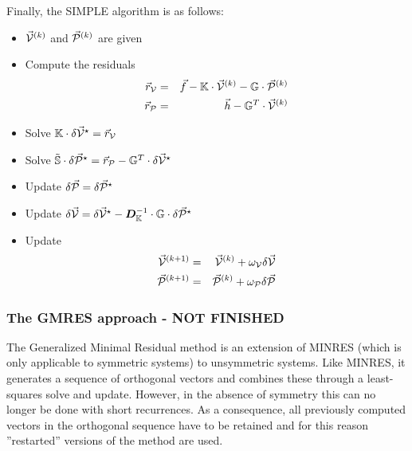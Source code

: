 Finally, the SIMPLE algorithm is as follows:
\begin{itemize}
\item $\vec{\cal V}^{(k)}$ and $\vec{\cal P}^{(k)}$ are given
\item Compute the residuals 
\begin{eqnarray}
\vec{r}_{\cal V} &=& \vec{f} - {\mathbb{K}} \cdot \vec{\cal V}^{(k)} - {\mathbb{G}} \cdot \vec{\cal P}^{(k)} \nonumber\\
\vec{r}_{\cal P} &=& \vec{h} - {\mathbb{G}}^T \cdot \vec{\cal V}^{(k)}
\end{eqnarray}
\item Solve ${\mathbb{K}} \cdot \delta  \vec{\cal V}^{\star} = \vec{r}_{\cal V}$
\item Solve $\tilde{{\mathbb{S}}} \cdot \delta \vec{\cal P}^\star 
= \vec{r}_{\cal P} - {\mathbb{G}}^T \cdot \delta  \vec{\cal V}^{\star}$
\item Update $\delta \vec{\cal P} =\delta \vec{\cal P}^\star $
\item Update $ \delta  \vec{\cal V}  =  \delta  \vec{\cal V}^{\star} 
- {\bm D}_{\mathbb{K}}^{-1} \cdot {\mathbb{G}} \cdot \delta \vec{\cal P}^\star $
\item Update
\begin{eqnarray}
\vec{\cal V}^{(k+1)} &=& \vec{\cal V}^{(k)} + \omega_{\cal V} \delta \vec{\cal V} \nonumber\\
\vec{\cal P}^{(k+1)} &=& \vec{\cal P}^{(k)} + \omega_{\cal P} \delta \vec{\cal P} 
\end{eqnarray}

\end{itemize}















\subsubsection{The GMRES approach - NOT FINISHED}

The Generalized Minimal Residual method \cite{sasc86} 
is an extension of MINRES (which is only applicable to symmetric systems) to unsymmetric systems. 
Like MINRES, it generates a sequence of orthogonal vectors and 
combines these through a least-squares solve and update. However, 
in the absence of symmetry this can no longer be done with short recurrences. As a consequence, 
all previously computed vectors in the orthogonal sequence have to be retained and 
for this reason ''restarted'' versions of the method are used.

